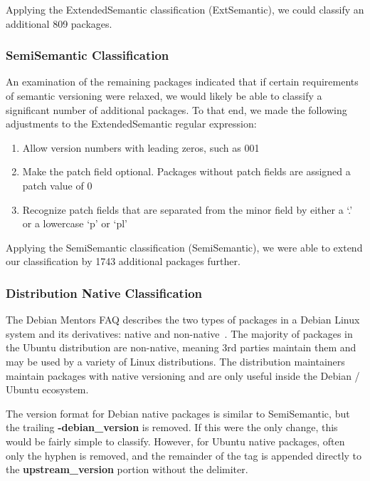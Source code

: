 \documentclass[sn-mathphys-num]{sn-jnl}%
\theoremstyle{thmstyleone}%
\theoremstyle{thmstyletwo}%
\theoremstyle{thmstylethree}%
\begin{document}
Applying the ExtendedSemantic classification (ExtSemantic), we could classify an additional 809 packages.

\subsubsection{\textbf{SemiSemantic Classification}} 

An examination of the remaining packages indicated that if certain requirements of semantic versioning were relaxed, we would likely be able to classify a significant number of additional packages. To that end, we made the following adjustments to the ExtendedSemantic regular expression:

\begin{enumerate}
    \item Allow version numbers with leading zeros, such as 001
    \item Make the patch field optional. Packages without patch fields are assigned a patch value of 0
    \item Recognize patch fields that are separated from the minor field by either a `.' or a lowercase `p' or `pl'
\end{enumerate}

Applying the SemiSemantic classification (SemiSemantic), we were able to extend our classification by 1743 additional packages further.

\subsubsection{\textbf{Distribution Native Classification}}

The Debian Mentors FAQ describes the two types of packages in a Debian Linux system and its derivatives: native and non-native~\cite{noauthor_debianmentorsfaq_nodate}. The majority of packages in the Ubuntu distribution are non-native, meaning 3rd parties maintain them and may be used by a variety of Linux distributions. The distribution maintainers maintain packages with native versioning and are only useful inside the Debian / Ubuntu ecosystem. 

The version format for Debian native packages is similar to SemiSemantic, but the trailing \textbf{-debian\_version} is removed. If this were the only change, this would be fairly simple to classify.  However, for Ubuntu native packages, often only the hyphen is removed, and the remainder of the tag is appended directly to the \textbf{upstream\_version} portion without the delimiter.  
\end{document}
